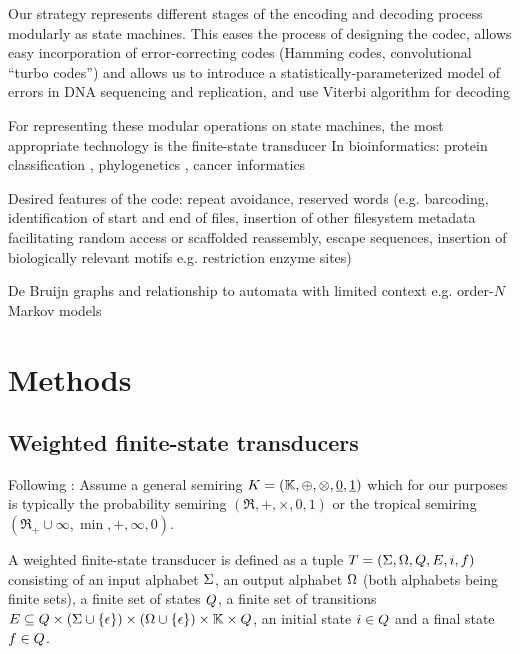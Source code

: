 \documentclass[english]{article}
\begin{document}
Our strategy represents different stages of the encoding and decoding process
modularly as state machines.
This eases the process of designing the codec,
allows easy incorporation of error-correcting codes
(Hamming codes, convolutional ``turbo codes'')
and allows us to introduce a statistically-parameterized model of errors
in DNA sequencing and replication,
and use Viterbi algorithm for decoding

For representing these modular operations on state machines,
the most appropriate technology is the finite-state transducer \cite{MohriPereiraRiley2000,WikipediaTransducers}
In bioinformatics:
protein classification \cite{EskinEtAl2000},
phylogenetics \cite{PatenEtAl2008,WestessonEtAlArxiv2012,WestessonEtAl2012},
cancer informatics \cite{SchwarzEtAl2014}

Desired features of the code:
repeat avoidance,
reserved words (e.g. barcoding,
identification of start and end of files,
insertion of other filesystem metadata facilitating random access or scaffolded reassembly,
escape sequences,
insertion of biologically relevant motifs e.g. restriction enzyme sites)

De Bruijn graphs \cite{DeBruijn1946,PevznerEtAl2001,ZerbinoBirney2008,IqbalEtAl2012}
and relationship to automata with limited context e.g. order-$N$ Markov models


\section{Methods}

\subsection{Weighted finite-state transducers}

Following \cite{MohriPereiraRiley2000}:
Assume a general semiring
$K=(\mathbb{K},\oplus,\otimes,\underline{0},\underline{1})$
which for our purposes is typically the probability semiring
$(\Re,+,\times,0,1)$
or the tropical semiring
$(\Re_{+} \cup {\infty},\min,+,\infty,0)$.

A weighted finite-state transducer is defined as a tuple
$T = (\Sigma,\Omega,Q,E,i,f)$
consisting of an input alphabet $\Sigma$,
an output alphabet $\Omega$ (both alphabets being finite sets),
a finite set of states $Q$,
a finite set of transitions
$E \subseteq Q \times (\Sigma \cup \{ \epsilon \}) \times (\Omega \cup \{ \epsilon \}) \times \mathbb{K} \times Q$,
an initial state $i \in Q$
and a final state $f \in Q$.
\end{document}

